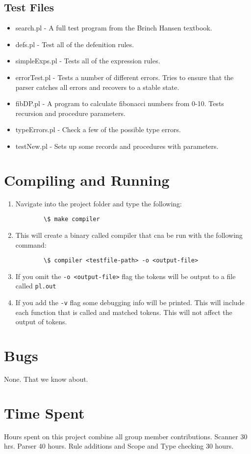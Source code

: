 \documentclass{article}
\begin{document}
\subsection{Test Files}
\begin{itemize}
	\item search.pl - A full test program from the Brinch Hansen textbook.
  \item defs.pl - Test all of the defenition rules.
  \item simpleExps.pl - Tests all of the expression rules.
  \item errorTest.pl - Tests a number of different errors. Tries to ensure that the parser catches all errors and recovers to a stable state.
  \item fibDP.pl - A program to calculate fibonacci numbers from 0-10. Tests recursion and procedure parameters.
  \item typeErrors.pl - Check a few of the possible type errors.
  \item testNew.pl - Sets up some records and procedures with parameters.
\end{itemize}

\section{Compiling and Running}
\begin{enumerate}
	\item Navigate into the project folder and type the following:

\verb|        \$ make compiler|

	\item This will create a binary called compiler that cna be run with the following command:

\verb|        \$ compiler <testfile-path> -o <output-file>|

	\item If you omit the \verb|-o <output-file>| flag the tokens will be output to a file called \verb|pl.out|
	\item If you add the \verb|-v| flag some debugging info will be printed. This will include each function that is called and matched tokens. This will not affect the output of tokens.
\end{enumerate}

\section{Bugs}
None. That we know about.


\section{Time Spent}
Hours spent on this project combine all group member contributions. Scanner 30 hrs. Parser 40 hours.
Rule additions and Scope and Type checking 30 hours.
\end{document}
